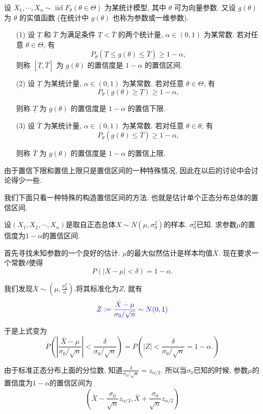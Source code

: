 \begin{definition}
    设 $X_1, \cdots, X_n \sim \operatorname{iid} F_\theta(\theta \in \Theta)$ 为某统计模型, 其中 $\theta$ 可为向量参数. 又设 $g(\theta)$ 为 $\theta$ 的实值函数 (在统计中 $g(\theta)$ 也称为参数或一维参数).

    \begin{itemize}
        \item [(1)] 设 $\underline{T}$ 和 $\bar{T}$ 为满足条件 $\underline{T}<\bar{T}$ 的两个统计量, $\alpha \in(0,1)$ 为某常数. 若对任意 $\theta \in \Theta$, 有
        $$
        P_\theta(\underline{T} \leq g(\theta) \leq \bar{T}) \geq 1-\alpha,
        $$
        则称 $[\underline T, \bar{T}]$ 为 $g(\theta)$ 的置信度是 $1-\alpha$ 的置信区间.
        \item [(2)] 设 $\underline T$ 为某统计量, $\alpha \in(0,1)$ 为某常数. 若对任意 $\theta \in \Theta$, 有
        $$
        P_\theta(g(\theta) \geq \underline{T}) \geq 1-\alpha,
        $$
        
        则称 $\underline T$ 为 $g(\theta)$ 的置信度是 $1-\alpha$ 的置信下限.
        \item [(3)] 设 $\bar{T}$ 为某统计量, $\alpha \in(0,1)$ 为某常数. 若对任意 $\theta \in \theta$, 有
        $$
        P_\theta(g(\theta) \leq \bar{T}) \geq 1-\alpha,
        $$
        
        则称 $\bar{T}$ 为 $g(\theta)$ 的置信度是 $1-\alpha$ 的置信上限.
    \end{itemize}
\end{definition}
由于置信下限和置信上限只是置信区间的一种特殊情况, 因此在以后的讨论中会讨论得少一些. 

我们下面只看一种特殊的构造置信区间的方法. 也就是估计单个正态分布总体的置信区间.

\begin{example}
    设$(X_1, X_2, \cdots, X_n)$是取自正态总体$X\sim N(\mu, \sigma_0^2)$的样本. $\sigma_0^2$已知. 求参数$\mu$的置信度为$1-\alpha$的置信区间.
\end{example}

\begin{solution}
    首先寻找未知参数的一个良好的估计. $\mu$的最大似然估计是样本均值$\bar X$. 现在要求一个常数$\delta$使得
$$
P(|X-\mu|<\delta)=1-\alpha.
$$

我们发现$\bar X \sim \left(\mu, \frac{\sigma_0^2}{n}\right).$将其标准化为$Z$, 就有
$$
{{\color{blue}Z:=\frac{
    \bar X-\mu
}{\sigma_0 / \sqrt n} \sim N(0, 1)}}
$$

于是上式变为
$$
P\left(
    \left|
       \frac{ \bar X - \mu }
            {\sigma_0 / \sqrt n}
    \right|
    < 
    \frac{
        \delta
    }{\sigma_0 / \sqrt n}
\right)=P\left(
    |Z|
    < 
    \frac{
        \delta
    }{\sigma_0 / \sqrt n}=1-\alpha.
\right)
$$

由于标准正态分布上面的分位数, 知道$\frac{\delta}{\sigma_0/\sqrt n}=z_{\alpha/2}$. 所以当$\sigma_0$已知的时候, 参数$\mu$的置信度为$1-\alpha$的置信区间为
$$
\left(
    \bar X - \frac{\sigma_0}{\sqrt n} z_{\alpha/2}, 
    \bar X + \frac{\sigma_0}{\sqrt n} z_{\alpha/2}
\right)
$$
\end{solution}

